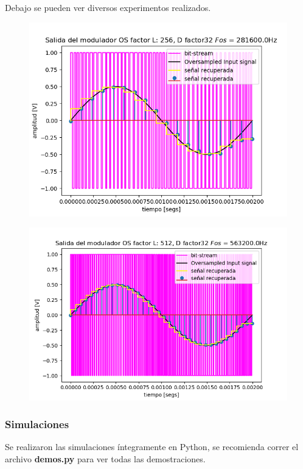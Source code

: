 Debajo se pueden ver diversos experimentos realizados.

\begin{figure}[H]
	\centering
	\includegraphics[width=0.7\linewidth]{ImagenesEjercicio2/SenalRecuperada256.png}
	\caption{}
	\label{fig:senalrecuperada256}
\end{figure}
\begin{figure}[H]
	\centering
	\includegraphics[width=0.7\linewidth]{ImagenesEjercicio2/SenalRecuperada512.png}
	\caption{}
	\label{fig:senalrecuperada256}
\end{figure}

\subsubsection{Simulaciones}
Se realizaron las simulaciones íntegramente en Python, se recomienda correr el archivo \textbf{demos.py} para ver todas las demostraciones.

